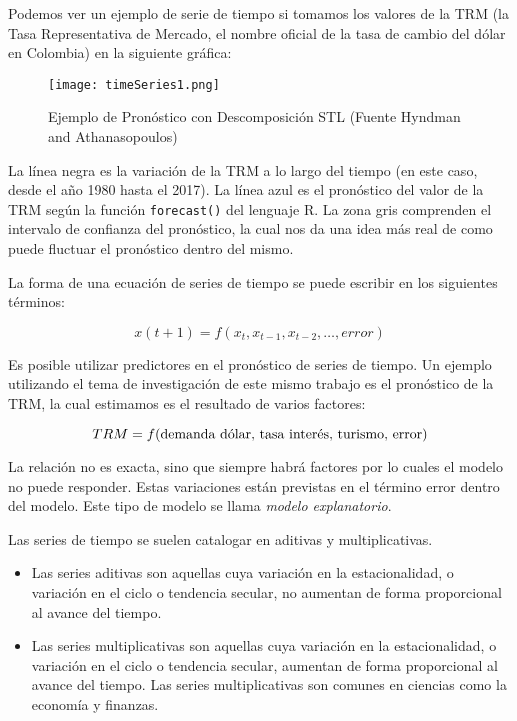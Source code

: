Podemos ver un ejemplo de serie de tiempo si tomamos los valores de la TRM (la Tasa Representativa de Mercado, el nombre oficial de la tasa de cambio del dólar en Colombia) en la siguiente gráfica:

\begin{figure}[h]
    \centering
    \texttt{[image: timeSeries1.png]}
    \caption{Ejemplo de Pronóstico con Descomposición STL (Fuente Hyndman and Athanasopoulos)}
\end{figure}

La línea negra es la variación de la TRM a lo largo del tiempo (en este caso, desde el año 1980 hasta el 2017). La línea azul es el pronóstico del valor de la TRM según la función \texttt{forecast()} del lenguaje R. La zona gris comprenden el intervalo de confianza del pronóstico, la cual nos da una idea más real de como puede fluctuar el pronóstico dentro del mismo.

La forma de una ecuación de series de tiempo se puede escribir en los siguientes términos:

\[ x(t+1) = f(x_t, x_{t-1}, x_{t-2}, \ldots, error) \]

Es posible utilizar predictores en el pronóstico de series de tiempo. Un ejemplo utilizando el tema de investigación de este mismo trabajo es el pronóstico de la TRM, la cual estimamos es el resultado de varios factores:

\[ TRM = f(\textnormal{demanda dólar, tasa interés, turismo, error}) \]

La relación no es exacta, sino que siempre habrá factores por lo cuales el modelo no puede responder. Estas variaciones están previstas en el término error dentro del modelo. Este tipo de modelo se llama \emph{modelo explanatorio}. 

Las series de tiempo se suelen catalogar en aditivas y multiplicativas. 

\begin{itemize}
	\item Las series aditivas son aquellas cuya variación en la estacionalidad, o variación en el ciclo o tendencia secular, no aumentan de forma proporcional al avance del tiempo.
	\item Las series multiplicativas son aquellas cuya variación en la estacionalidad, o variación en el ciclo o tendencia secular, aumentan de forma proporcional al avance del tiempo. Las series multiplicativas son comunes en ciencias como la economía y finanzas.
\end{itemize}

